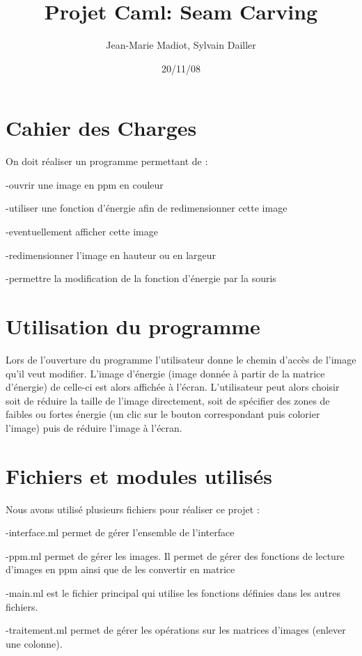 \documentclass[a4paper]{article}
\title{Projet Caml: Seam Carving}
\author{Jean-Marie Madiot, Sylvain Dailler}
\date{20/11/08}
\begin{document}
\maketitle{}

\section{Cahier des Charges}

On doit réaliser un programme permettant de :
\item{-ouvrir une image en ppm en couleur}
\item{-utiliser une fonction d'énergie afin de redimensionner cette image}
\item{-eventuellement afficher cette image}
\item{-redimensionner l'image en hauteur ou en largeur}
\item{-permettre la modification de la fonction d'énergie par la souris}


\section{Utilisation du programme}

Lors de l'ouverture du programme l'utilisateur donne le chemin d'accès de l'image qu'il veut modifier. L'image d'énergie (image donnée à partir de la matrice d'énergie) de celle-ci est alors affichée à l'écran. L'utilisateur peut alors choisir soit de réduire la taille de l'image directement, soit de spécifier des zones de faibles ou fortes énergie (un clic sur le bouton correspondant puis colorier l'image) puis de réduire l'image à l'écran.

\section{Fichiers et modules utilisés}

Nous avons utilisé plusieurs fichiers pour réaliser ce projet : 
\item{-interface.ml permet de gérer l'ensemble de l'interface} 
\item{-ppm.ml permet de gérer les images. Il permet de gérer des fonctions de lecture d'images en ppm ainsi que de les  convertir en matrice}
\item{-main.ml est le fichier principal qui utilise les fonctions définies dans les autres fichiers.}
\item{-traitement.ml permet de gérer les opérations sur les matrices d'images (enlever une colonne).} 
\end{document}
